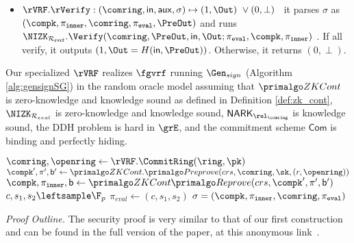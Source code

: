 \begin{itemize}
	\item  $\rVRF.\rVerify : (\comring,\msg,\aux,\sigma) \mapsto (1,\Out) \,\, \lor (0,\perp)$ \,
	it parses $\sigma$ as $(\compk, \allowbreak \pi_{\mathtt{inner}}, \allowbreak \comring, \allowbreak \pieval, \PreOut)$ and runs  $\NIZK_{\relrvrf}.\Verify(\comring, \PreOut, \msg, \Out; \pieval,\compk, \pi_{\mathtt{inner}})$  . If all verify, it outputs $ (1,\Out = H(\msg,\PreOut)) $. Otherwise, it returns $ (0,\perp) $.
\end{itemize}




\begin{theorem}\label{thm:rvrfspecial}
	Our specialized $ \rVRF $   realizes $ \fgvrf $ running $ \Gen_{sign} $ (Algorithm \ref{alg:gensignSG}) \cite{canetti1,canetti2} in the random oracle model assuming that $\ZKCont $ is zero-knowledge and knowledge sound as defined in Definition \ref{def:zk_cont}, $ \NIZK_{\mathcal{R}_{eval}} $ is zero-knowledge and knowledge sound, $ \NARK_{\relcomring} $ is knowledge sound, the DDH problem is hard in $ \grE  $, %
	and the commitment scheme $ \mathsf{Com} $ is binding and perfectly hiding. 
\end{theorem}
\begin{algorithm}
	\eprint{}{\scriptsize}
	\caption{$\Gen_{sign}(\ring, \sk= (x,r),\pk,\aux,\msg)$}
	\label{alg:gensignSG}	 	
	\begin{algorithmic}[1]
		\State $ \comring, \openring \leftarrow \rVRF.\CommitRing(\ring, \pk) $
		\State $ \compk', \pi', \openpk' \leftarrow \ZKCont.\Preprove(crs, \comring,\sk,(r,\openring)) $
		\State $ \compk, \pi_{\mathtt{inner}}, \openpk \leftarrow \ZKCont\Reprove(crs, \compk',\pi',\openpk') $ 
		\State $ c,s_1, s_2 \leftsample \F_p $
		\State $ \pi_{eval}  \leftarrow (c,s_1, s_2)$		
		\State\Return$ \sigma = (\compk, \pi_{\mathtt{inner}},\comring, \pieval) $
	\end{algorithmic}
	
\end{algorithm}

\noindent \textit{Proof Outline.}  The security proof is very similar to that of our first construction
and can be found in the full version of the paper, at this anonymous link~\cite{anonymous}.



